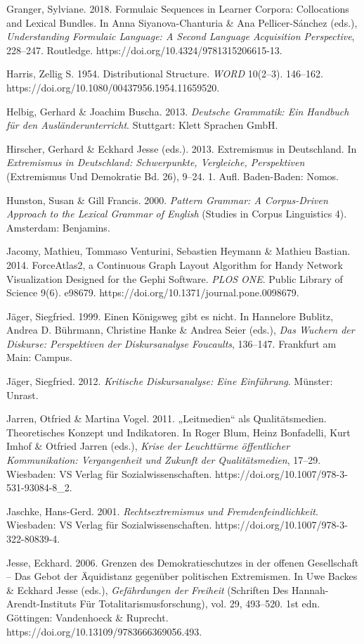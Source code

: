 Granger, Sylviane. 2018. Formulaic Sequences in Learner Corpora: Collocations and Lexical Bundles. In Anna Siyanova-Chanturia \& Ana Pellicer-Sánchez (eds.), \emph{Understanding Formulaic Language: A Second Language Acquisition Perspective}, 228--247. Routledge. https://doi.org/10.4324/9781315206615-13.

Harris, Zellig S. 1954. Distributional Structure. \emph{WORD} 10(2--3). 146--162. https://doi.org/10.1080/00437956.1954.11659520.

Helbig, Gerhard \& Joachim Buscha. 2013. \emph{Deutsche Grammatik: Ein Handbuch für den Ausländerunterricht}. Stuttgart: Klett Sprachen GmbH.

Hirscher, Gerhard \& Eckhard Jesse (eds.). 2013. Extremismus in Deutschland. In \emph{Extremismus in Deutschland: Schwerpunkte, Vergleiche, Perspektiven} (Extremismus Und Demokratie Bd. 26), 9--24. 1. Aufl. Baden-Baden: Nomos.

Hunston, Susan \& Gill Francis. 2000. \emph{Pattern Grammar: A Corpus-Driven Approach to the Lexical Grammar of English} (Studies in Corpus Linguistics 4). Amsterdam: Benjamins.

Jacomy, Mathieu, Tommaso Venturini, Sebastien Heymann \& Mathieu Bastian. 2014. ForceAtlas2, a Continuous Graph Layout Algorithm for Handy Network Visualization Designed for the Gephi Software. \emph{PLOS ONE}. Public Library of Science 9(6). e98679. https://doi.org/10.1371/journal.pone.0098679.

Jäger, Siegfried. 1999. Einen Königsweg gibt es nicht. In Hannelore Bublitz, Andrea D. Bührmann, Christine Hanke \& Andrea Seier (eds.), \emph{Das Wuchern der Diskurse: Perspektiven der Diskursanalyse Foucaults}, 136--147. Frankfurt am Main: Campus.

Jäger, Siegfried. 2012. \emph{Kritische Diskursanalyse: Eine Einführung}. Münster: Unrast.

Jarren, Otfried \& Martina Vogel. 2011. „Leitmedien`` als Qualitätsmedien. Theoretisches Konzept und Indikatoren. In Roger Blum, Heinz Bonfadelli, Kurt Imhof \& Otfried Jarren (eds.), \emph{Krise der Leuchttürme öffentlicher Kommunikation: Vergangenheit und Zukunft der Qualitätsmedien}, 17--29. Wiesbaden: VS Verlag für Sozialwissenschaften. https://doi.org/10.1007/978-3-531-93084-8\_2.

Jaschke, Hans-Gerd. 2001. \emph{Rechtsextremismus und Fremdenfeindlichkeit}. Wiesbaden: VS Verlag für Sozialwissenschaften. https://doi.org/10.1007/978-3-322-80839-4.

Jesse, Eckhard. 2006. Grenzen des Demokratieschutzes in der offenen Gesellschaft -- Das Gebot der Äquidistanz gegenüber politischen Extremismen. In Uwe Backes \& Eckhard Jesse (eds.), \emph{Gefährdungen der Freiheit} (Schriften Des Hannah-Arendt-Instituts Für Totalitarismusforschung), vol. 29, 493--520. 1st edn. Göttingen: Vandenhoeck \& Ruprecht. https://doi.org/10.13109/9783666369056.493.

